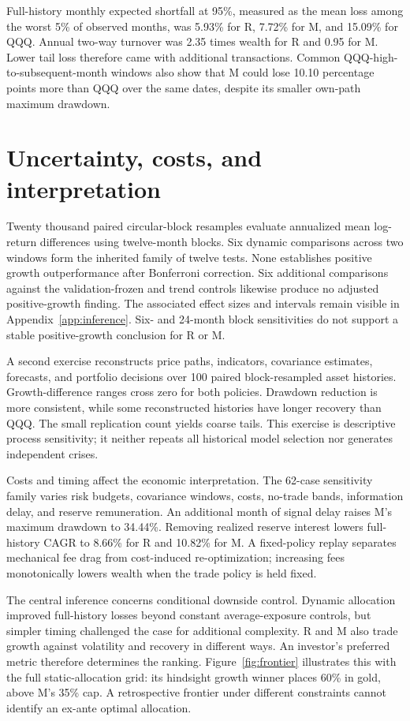 \documentclass[12pt,letterpaper]{article}
\begin{document}
Full-history monthly expected shortfall at 95\%, measured as the mean loss among the worst 5\% of observed months, was 5.93\% for R, 7.72\% for M, and 15.09\% for QQQ. Annual two-way turnover was 2.35 times wealth for R and 0.95 for M. Lower tail loss therefore came with additional transactions. Common QQQ-high-to-subsequent-month windows also show that M could lose 10.10 percentage points more than QQQ over the same dates, despite its smaller own-path maximum drawdown.

\section{Uncertainty, costs, and interpretation}
Twenty thousand paired circular-block resamples evaluate annualized mean log-return differences using twelve-month blocks. Six dynamic comparisons across two windows form the inherited family of twelve tests. None establishes positive growth outperformance after Bonferroni correction. Six additional comparisons against the validation-frozen and trend controls likewise produce no adjusted positive-growth finding. The associated effect sizes and intervals remain visible in Appendix~\ref{app:inference}. Six- and 24-month block sensitivities do not support a stable positive-growth conclusion for R or M.

A second exercise reconstructs price paths, indicators, covariance estimates, forecasts, and portfolio decisions over 100 paired block-resampled asset histories. Growth-difference ranges cross zero for both policies. Drawdown reduction is more consistent, while some reconstructed histories have longer recovery than QQQ. The small replication count yields coarse tails. This exercise is descriptive process sensitivity; it neither repeats all historical model selection nor generates independent crises.

Costs and timing affect the economic interpretation. The 62-case sensitivity family varies risk budgets, covariance windows, costs, no-trade bands, information delay, and reserve remuneration. An additional month of signal delay raises M's maximum drawdown to 34.44\%. Removing realized reserve interest lowers full-history CAGR to 8.66\% for R and 10.82\% for M. A fixed-policy replay separates mechanical fee drag from cost-induced re-optimization; increasing fees monotonically lowers wealth when the trade policy is held fixed.

The central inference concerns conditional downside control. Dynamic allocation improved full-history losses beyond constant average-exposure controls, but simpler timing challenged the case for additional complexity. R and M also trade growth against volatility and recovery in different ways. An investor's preferred metric therefore determines the ranking. Figure~\ref{fig:frontier} illustrates this with the full static-allocation grid: its hindsight growth winner places 60\% in gold, above M's 35\% cap. A retrospective frontier under different constraints cannot identify an ex-ante optimal allocation.
\end{document}
